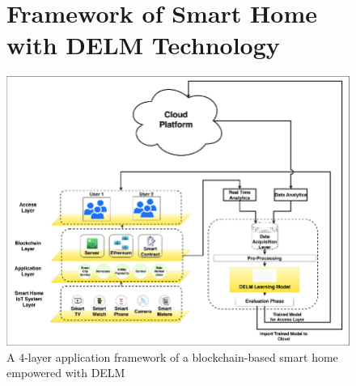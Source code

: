 \begin{appendices}
\begin{figure}[ht!]
        \section{Framework of Smart Home with DELM Technology \cite{khanEtAl2021}}
        \label{sec:framework-of-smart-home-with-delm-technology}
        \includegraphics[width=\linewidth]{datasets/images/A5}
        \caption{A 4-layer application framework of a blockchain-based smart home empowered with DELM}\label{fig:figure8}
    \end{figure}

\end{appendices}
